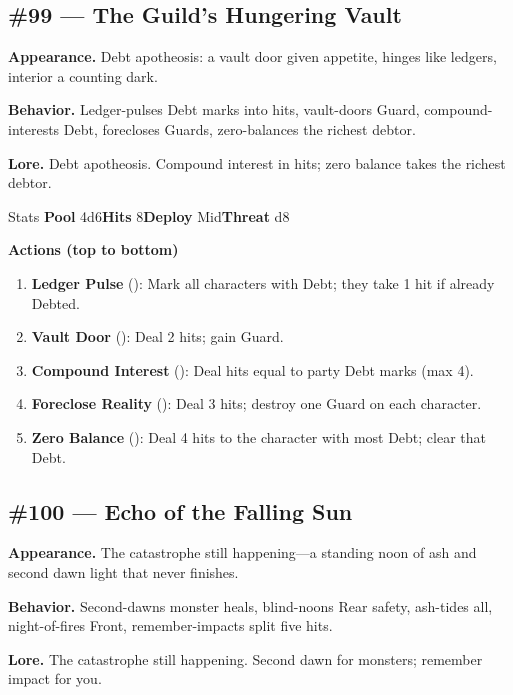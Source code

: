 \subsection*{\#99 --- The Guild's Hungering Vault}

\textbf{Appearance.} Debt apotheosis: a vault door given appetite, hinges like ledgers, interior a counting dark.

\textbf{Behavior.} Ledger-pulses Debt marks into hits, vault-doors Guard, compound-interests Debt, forecloses Guards, zero-balances the richest debtor.

\textbf{Lore.} Debt apotheosis. Compound interest in hits; zero balance takes the richest debtor.

\begin{monsterentry}{Stats}
\textbf{Pool} 4d6\quad\textbf{Hits} 8\quad\textbf{Deploy} Mid\quad\textbf{Threat} d8

\textbf{Actions (top to bottom)}
\begin{enumerate}\setlength{\itemsep}{0.15em}\setlength{\parskip}{0pt}
  \item \textbf{Ledger Pulse} (\easy): Mark all characters with Debt; they take 1 hit if already Debted.
  \item \textbf{Vault Door} (\medium): Deal 2 hits; gain Guard.
  \item \textbf{Compound Interest} (\hard): Deal hits equal to party Debt marks (max 4).
  \item \textbf{Foreclose Reality} (\hard): Deal 3 hits; destroy one Guard on each character.
  \item \textbf{Zero Balance} (\hard): Deal 4 hits to the character with most Debt; clear that Debt.
\end{enumerate}
\end{monsterentry}

\subsection*{\#100 --- Echo of the Falling Sun}

\textbf{Appearance.} The catastrophe still happening---a standing noon of ash and second dawn light that never finishes.

\textbf{Behavior.} Second-dawns monster heals, blind-noons Rear safety, ash-tides all, night-of-fires Front, remember-impacts split five hits.

\textbf{Lore.} The catastrophe still happening. Second dawn for monsters; remember impact for you.


